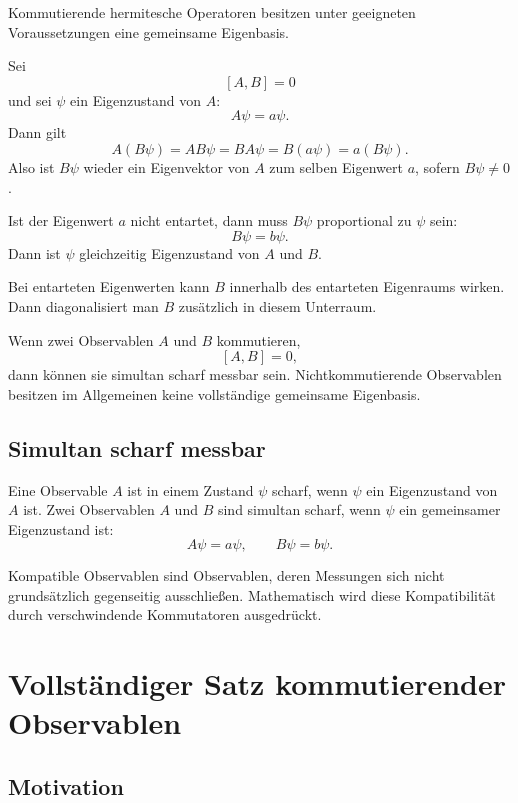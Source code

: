 Kommutierende hermitesche Operatoren besitzen unter geeigneten Voraussetzungen eine gemeinsame Eigenbasis.

\begin{derivationbox}
Sei
\[
    [A,B]=0
\]
und sei $\psi$ ein Eigenzustand von $A$:
\[
    A\psi=a\psi.
\]
Dann gilt
\[
    A(B\psi)=AB\psi=BA\psi=B(a\psi)=a(B\psi).
\]
Also ist $B\psi$ wieder ein Eigenvektor von $A$ zum selben Eigenwert $a$, sofern $B\psi\ne0$.

Ist der Eigenwert $a$ nicht entartet, dann muss $B\psi$ proportional zu $\psi$ sein:
\[
    B\psi=b\psi.
\]
Dann ist $\psi$ gleichzeitig Eigenzustand von $A$ und $B$.
\end{derivationbox}

Bei entarteten Eigenwerten kann $B$ innerhalb des entarteten Eigenraums wirken. Dann diagonalisiert man $B$ zusätzlich in diesem Unterraum.

\begin{formulabox}
Wenn zwei Observablen $A$ und $B$ kommutieren,
\[
    [A,B]=0,
\]
dann können sie simultan scharf messbar sein. Nichtkommutierende Observablen besitzen im Allgemeinen keine vollständige gemeinsame Eigenbasis.
\end{formulabox}

\subsection{Simultan scharf messbar}

Eine Observable $A$ ist in einem Zustand $\psi$ scharf, wenn $\psi$ ein Eigenzustand von $A$ ist. Zwei Observablen $A$ und $B$ sind simultan scharf, wenn $\psi$ ein gemeinsamer Eigenzustand ist:
\[
    A\psi=a\psi,
    \qquad
    B\psi=b\psi.
\]

\begin{conceptbox}
Kompatible Observablen sind Observablen, deren Messungen sich nicht grundsätzlich gegenseitig ausschließen. Mathematisch wird diese Kompatibilität durch verschwindende Kommutatoren ausgedrückt.
\end{conceptbox}

\section{Vollständiger Satz kommutierender Observablen}

\subsection{Motivation}

